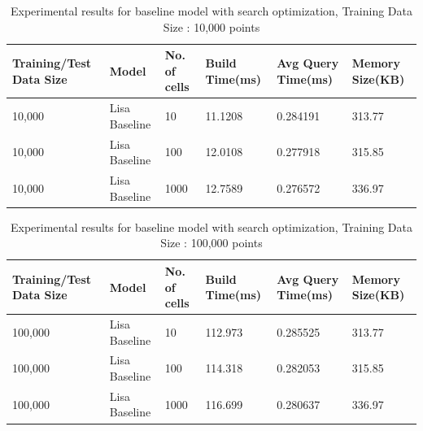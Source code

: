 \begin{table}[ht]
	\centering
	\begin{tabular}{||p{}<{\centering}|p{}<{\centering}| p{}<{\centering}|p{}<{\centering}|p{}<{\centering}|p{}<{\centering}||}
		\hline
		Training/Test Data Size& Model & No. of cells & Build Time(ms) & Avg Query Time(ms) & Memory Size(KB)\\ [0.5ex] 
		\hline
		\hline
		10,000& Lisa Baseline & 10 & 11.1208 & 0.284191 & 313.77\\
		\hline
		10,000& Lisa Baseline & 100 & 12.0108 & 0.277918 & 315.85\\
		\hline
		10,000& Lisa Baseline & 1000 & 12.7589 & 0.276572 & 336.97\\
		\hline
		\hline
	\end{tabular}
	\label{baseline_search_optimization}
	\caption{Experimental results for baseline model with search optimization, Training Data Size : 10,000 points}
\end{table}

\begin{table}[ht]
	\centering
	\begin{tabular}{||p{}<{\centering}|p{}<{\centering}| p{}<{\centering}|p{}<{\centering}|p{}<{\centering}|p{}<{\centering}||}
		\hline
		Training/Test Data Size& Model & No. of cells & Build Time(ms) & Avg Query Time(ms) & Memory Size(KB)\\ [0.5ex] 
		\hline
		\hline
		100,000& Lisa Baseline & 10 & 112.973 & 0.285525 & 313.77\\
		\hline
		100,000& Lisa Baseline & 100 & 114.318 & 0.282053 & 315.85\\
		\hline
		100,000& Lisa Baseline & 1000 & 116.699 & 0.280637 & 336.97\\
		\hline
		\hline
	\end{tabular}
	\label{baseline_search_optimization}
	\caption{Experimental results for baseline model with search optimization, Training Data Size : 100,000 points}
\end{table}

